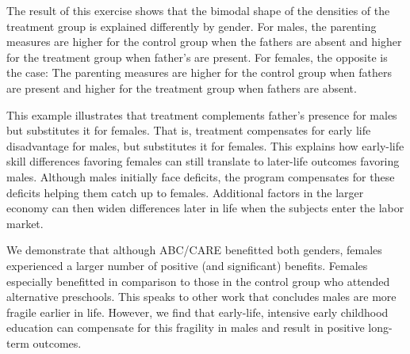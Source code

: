 The result of this exercise shows that the bimodal shape of the densities of the treatment group is explained differently by gender. For males, the parenting measures are higher for the control group when the fathers are absent and higher for the treatment group when father's are present. For females, the opposite is the case: The parenting measures are higher for the control group when fathers are present and higher for the treatment group when fathers are absent. 

This example illustrates that treatment complements father's presence for males but substitutes it for females. That is, treatment compensates for early life disadvantage for males, but substitutes it for females. This explains how early-life skill differences favoring females can still translate to later-life outcomes favoring males. Although males initially face deficits, the program compensates for these deficits helping them catch up to females. Additional factors in the larger economy can then widen differences later in life when the subjects enter the labor market. 

We demonstrate that although ABC/CARE benefitted both genders, females experienced a larger number of positive (and significant) benefits. Females especially benefitted in comparison to those in the control group who attended alternative preschools. This speaks to other work that concludes males are more fragile earlier in life. However, we find that early-life, intensive early childhood education can compensate for this fragility in males and result in positive long-term outcomes.
